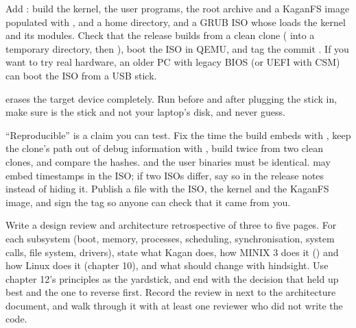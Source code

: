 \documentclass[11pt,a4paper]{article}
\begin{document}
Add : build the kernel, the user programs, the root archive and a KaganFS image populated with
,  and a home directory, and a GRUB ISO whose  loads the kernel and its modules.
Check that the release builds from a clean clone ( into a temporary directory, then ),
boot the ISO in QEMU, and tag the commit . If you want to try real hardware, an older PC with legacy BIOS (or
UEFI with CSM) can boot the ISO from a USB stick.

\begin{warnbox}
 erases the target device completely. Run  before and
after plugging the stick in, make sure  is the stick and not your laptop's disk, and never guess.
\end{warnbox}

``Reproducible'' is a claim you can test. Fix the time the build embeds with , keep the
clone's path out of debug information with , build twice from two clean clones, and compare the
hashes.  and the user binaries must be identical.  may embed timestamps in the ISO;
if two ISOs differ, say so in the release notes instead of hiding it. Publish a  file with the ISO, the
kernel and the KaganFS image, and sign the tag so anyone can check that it came from you.


Write a design review and architecture retrospective of three to five pages. For each subsystem (boot, memory, processes,
scheduling, synchronisation, system calls, file system, drivers), state what Kagan does, how MINIX 3 does it
(\OSDI) and how Linux does it (\MOS chapter 10), and what should change with hindsight. Use \MOS chapter 12's
principles as the yardstick, and end with the decision that held up best and the one to reverse first. Record the
review in  next to the architecture document, and walk through it with at least one reviewer who did not
write the code.
\end{document}
